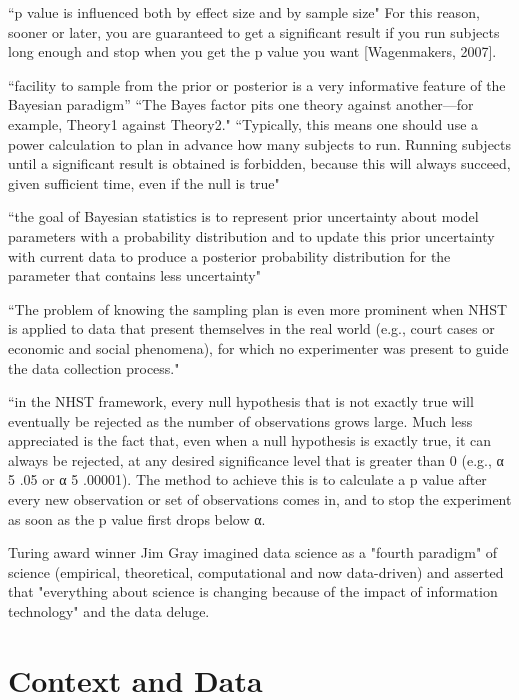 \documentclass[inte,blindrev]{informs3}
\begin{document}
``p value is influenced both by effect size and by sample size"\citep[pp. 787]{wagenmakers2007practical}
For this reason, sooner or later, you are guaranteed to get a significant result if you run subjects long enough and stop when you get the p value you want [Wagenmakers, 2007].

``facility to sample from the prior or posterior is a very informative feature of the Bayesian paradigm''\cite{tipping2004bayesian}
``The Bayes factor pits one theory against another—for example, Theory1 against Theory2."\citep[p. 277]{dienes2011bayesian}
``Typically, this means one should use a power calculation to plan in advance how many subjects to run. Running subjects until a significant result is obtained is forbidden, because this will always succeed,  given sufficient time, even if the null is true"\citep[p. 278]{dienes2011bayesian}

``the goal of Bayesian statistics is to represent prior uncertainty about model parameters with a probability distribution and to update this prior uncertainty with current data to produce a posterior probability distribution for the parameter that contains less uncertainty"\citep[p. 50]{lynch2007introduction}

``The problem of knowing the sampling plan is even more prominent when NHST is applied to data that present themselves in the real
world (e.g., court cases or economic and social phenomena), for which no experimenter was present to guide the data collection process."\citep[pp. 784]{wagenmakers2007practical}

``in the NHST framework, every null hypothesis that is not exactly true will eventually be rejected as the number of observations grows large. Much less appreciated is the fact that, even when a null hypothesis is exactly true, it can always be rejected, at any desired significance level that is greater than 0 (e.g., α 5 .05 or α 5 .00001). The method to achieve this is to calculate a p value after every new observation or set of observations comes in, and to stop the experiment as soon as the p value first drops below α.\citep[pp. 784]{wagenmakers2007practical} 

Turing award winner Jim Gray imagined data science as a "fourth paradigm" of science (empirical, theoretical, computational and now data-driven) and asserted that "everything about science is changing because of the impact of information technology" and the data deluge.\citep{bell2009beyond, hey2009fourth}
\section*{Context and Data}
\end{document}
